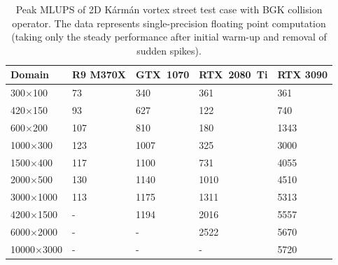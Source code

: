 \begin{table}[!ht]
	\centering\small
	{\renewcommand{\arraystretch}{1.1}%
		{\setlength{\tabcolsep}{0.5em}
	\begin{tabular}{ |p{2.7cm}||p{2.2cm}|p{2.2cm}|p{2.4cm}|p{2.21cm}|  }
		\hline
		Domain & R9 M370X & GTX~1070 & RTX~2080~Ti & RTX 3090 \\
		\hline
		300$\times$100   & 73 & 340 & 361    & 361  \\
		\hline
		420$\times$150   & 93 & 627 & 122    & 740  \\
		\hline
		600$\times$200   & 107 & 810 & 180    & 1343  \\
		\hline
		1000$\times$300   & 123 & 1007 & 325    & 3000  \\
		\hline
		1500$\times$400   & 117 & 1100 & 731    & 4055  \\
		\hline
		2000$\times$500   & 130 & 1140 & 1010    & 4510  \\
		\hline
		3000$\times$1000   & 113 & 1175 & 1311    & 5313  \\
		\hline
		4200$\times$1500   & - & 1194 & 2016    & 5557  \\
		\hline
		6000$\times$2000   & - & - & 2522  & 5670  \\
		\hline
		10000$\times$3000   & - & - & -   & 5720  \\
		\hline
	\end{tabular}}}
	\caption{Peak MLUPS of 2D Kármán vortex street test case with BGK collision operator. The data represents single-precision floating point computation (taking only the steady performance after initial warm-up and removal of sudden spikes).}
	\label{tab:channel-mlups}
\end{table}


